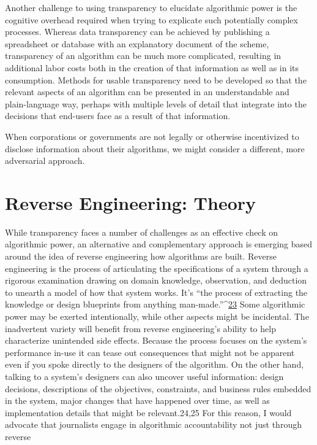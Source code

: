 Another challenge to using transparency to elucidate algorithmic power is the cognitive overhead required when trying to explicate such potentially complex processes. Whereas data transparency can be achieved by publishing a spreadsheet or database with an explanatory document of the scheme, transparency of an algorithm can be much more complicated, resulting in additional labor costs both in the creation of that information as well as in its consumption. Methods for usable transparency need to be developed so that the relevant aspects of an algorithm can be presented in an understandable and plain-language way, perhaps with multiple levels of detail that integrate into the decisions that end-users face as a result of that information. 

When corporations or governments are not legally or otherwise incentivized to disclose information about their algorithms, we might consider a different, more adversarial approach. 

\chapter{Reverse Engineering: Theory }
While transparency faces a number of challenges as an effective check on algorithmic power, an alternative and complementary approach is emerging based around the idea of reverse engineering how algorithms are built. Reverse engineering is the process of articulating the specifications of a system through a rigorous examination drawing on domain knowledge, observation, and deduction to unearth a model of how that system works. It's ``the process of extracting the knowledge or design blueprints from anything man-made.''^{\href{#endnotes}{23}}
Some algorithmic power may be exerted intentionally, while other aspects might be incidental. The inadvertent variety will benefit from reverse engineering's ability to help characterize unintended side effects. Because the process focuses on the system's performance in-use it can tease out consequences that might not be apparent even if you spoke directly to the designers of the algorithm. On the other hand, talking to a system's designers can also uncover useful information: design decisions, descriptions of the objectives, constraints, and business rules embedded in the system, major changes that have happened over time, as well as implementation details that might be relevant.24,25 For this reason, I would advocate that journalists engage in algorithmic accountability not just through reverse 

